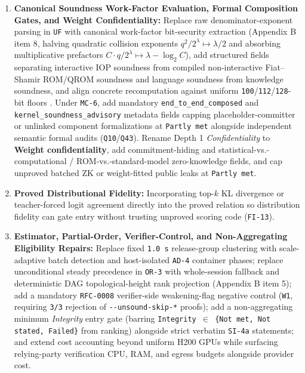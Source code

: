 \documentclass[11pt,letterpaper]{article}
\begin{document}
\begin{enumerate}
\item \textbf{Canonical Soundness Work-Factor Evaluation, Formal Composition Gates, and Weight Confidentiality:} Replace raw denominator-exponent parsing in \texttt{UF} with canonical work-factor bit-security extraction (Appendix B item 8, halving quadratic collision exponents $q^2/2^\lambda \mapsto \lambda/2$ and absorbing multiplicative prefactors $C \cdot q/2^\lambda \mapsto \lambda - \log_2 C$), add structured fields separating interactive IOP soundness from compiled non-interactive Fiat--Shamir ROM/QROM soundness and language soundness from knowledge soundness, and align concrete recomputation against uniform \texttt{100}/\texttt{112}/\texttt{128}-bit floors \cite{iproofs2026}. Under \texttt{MC-6}, add mandatory \texttt{end\_\allowbreak{}to\_\allowbreak{}end\_\allowbreak{}composed} and \texttt{kernel\_\allowbreak{}soundness\_\allowbreak{}advisory} metadata fields capping placeholder-committer or unlinked component formalizations at \texttt{Partly met} alongside independent semantic formal audits (\texttt{Q10}/\texttt{Q43}). Rename Depth 1 \textit{Confidentiality} to \textbf{Weight confidentiality}, add commitment-hiding and statistical-vs.-computational / ROM-vs.-standard-model zero-knowledge fields, and cap unproved batched ZK or weight-fitted public leaks at \texttt{Partly met}.
\item \textbf{Proved Distributional Fidelity:} Incorporating top-$k$ KL divergence or teacher-forced logit agreement directly into the proved relation so distribution fidelity can gate entry without trusting unproved scoring code (\texttt{FI-13}).
\item \textbf{Estimator, Partial-Order, Verifier-Control, and Non-Aggregating Eligibility Repairs:} Replace fixed \texttt{1.0 s} release-group clustering with scale-adaptive batch detection and host-isolated \texttt{AD-4} container phases; replace unconditional steady precedence in \texttt{OR-3} with whole-session fallback and deterministic DAG topological-height rank projection (Appendix B item 5); add a mandatory \texttt{RFC-0008} verifier-side weakening-flag negative control (\texttt{W1}, requiring \texttt{3/\allowbreak{}3} rejection of \texttt{-{}-unsound-\allowbreak{}skip-*} proofs); add a non-aggregating minimum \textit{Integrity} entry gate (barring \texttt{Integrity $\in$ \{Not met, Not stated, Failed\}} from ranking) alongside strict verbatim \texttt{SI-4a} statements; and extend cost accounting beyond uniform H200 GPUs while surfacing relying-party verification CPU, RAM, and egress budgets alongside provider cost.

\end{enumerate}
\end{document}
